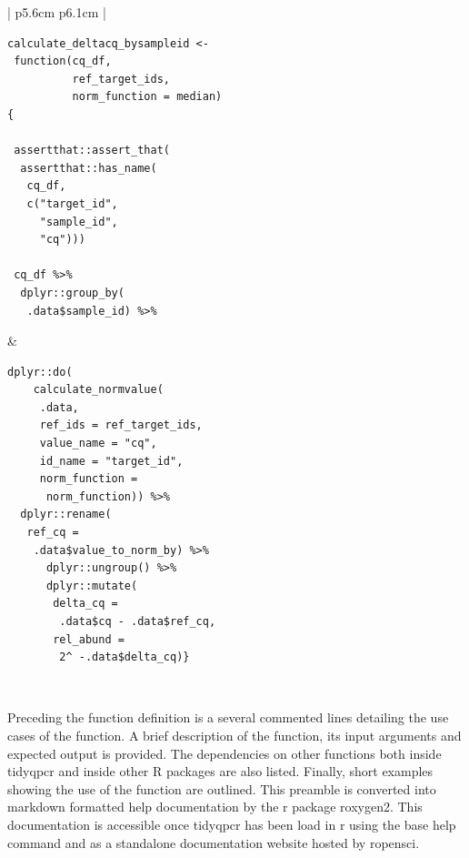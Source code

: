 \documentclass{SBCbookchapter}
\begin{document}
\begin{center}
\begin{tabular}{| p{5.6cm}  p{6.1cm} |}
\hline
\begin{lstlisting}
calculate_deltacq_bysampleid <- 
 function(cq_df,
          ref_target_ids,
          norm_function = median) 
{

 assertthat::assert_that(
  assertthat::has_name(
   cq_df, 
   c("target_id",
     "sample_id",
     "cq")))
     
 cq_df %>%
  dplyr::group_by(
   .data$sample_id) %>%
\end{lstlisting} &

\begin{lstlisting}[firstnumber=17]
   dplyr::do(
    calculate_normvalue(
     .data,
     ref_ids = ref_target_ids,
     value_name = "cq",
     id_name = "target_id",
     norm_function = 
      norm_function)) %>%
  dplyr::rename(
   ref_cq = 
    .data$value_to_norm_by) %>%
      dplyr::ungroup() %>%
      dplyr::mutate(
       delta_cq = 
        .data$cq - .data$ref_cq,
       rel_abund = 
        2^ -.data$delta_cq)}
\end{lstlisting} \\
\hline
\end{tabular}
\end{center}
Preceding the function definition is a several commented lines detailing the use cases of the function. A brief description of the function, its input arguments and expected output is provided. The dependencies on other functions both inside tidyqpcr and inside other R packages are also listed. Finally, short examples showing the use of the function are outlined. This preamble is converted into markdown formatted help documentation by the r package roxygen2. This documentation is accessible once tidyqpcr has been load in r using the base help command and as a standalone documentation website hosted by ropensci.
\end{document}
